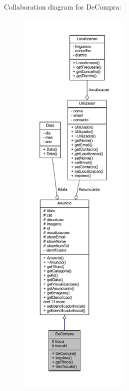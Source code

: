 Collaboration diagram for De\+Compra\+:
\nopagebreak
\begin{figure}[H]
\begin{center}
\leavevmode
\includegraphics[height=550pt]{class_de_compra__coll__graph}
\end{center}
\end{figure}
